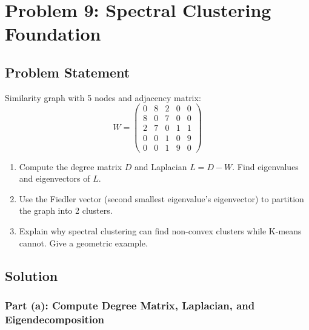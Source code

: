 \documentclass[12pt]{article}
\begin{document}
\section{Problem 9: Spectral Clustering Foundation}

\subsection{Problem Statement}

Similarity graph with 5 nodes and adjacency matrix:
\[
W = \begin{pmatrix}
0 & 8 & 2 & 0 & 0 \\
8 & 0 & 7 & 0 & 0 \\
2 & 7 & 0 & 1 & 1 \\
0 & 0 & 1 & 0 & 9 \\
0 & 0 & 1 & 9 & 0
\end{pmatrix}
\]

\begin{enumerate}
\item[(a)] Compute the degree matrix \(D\) and Laplacian \(L = D - W\). Find eigenvalues and eigenvectors of \(L\).
\item[(b)] Use the Fiedler vector (second smallest eigenvalue's eigenvector) to partition the graph into 2 clusters.
\item[(c)] Explain why spectral clustering can find non-convex clusters while K-means cannot. Give a geometric example.
\end{enumerate}

\subsection{Solution}

\subsubsection{Part (a): Compute Degree Matrix, Laplacian, and Eigendecomposition}
\end{document}
